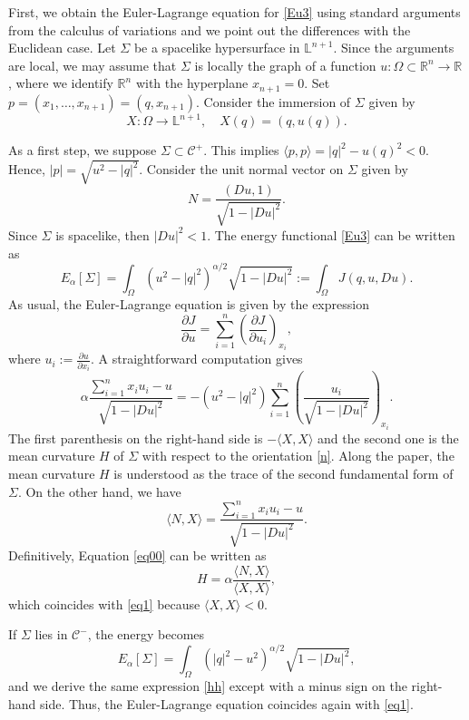 \documentclass[a4paper,12pt]{amsart}
\theoremstyle{definition}
\def\r{\mathbb R}
\def\l{\mathbb L}
\begin{document}
First, we obtain the Euler-Lagrange equation for \eqref{Eu3} using standard arguments from the calculus of variations and we point out the differences with the Euclidean case.  Let $\Sigma$ be a spacelike hypersurface in $\l^{n+1}$. Since the arguments are local, we may assume that $\Sigma$ is locally the graph of a function $u \colon \Omega \subset \mathbb{R}^n \to \mathbb{R}$, where we identify $\r^n$ with the hyperplane $x_{n+1}=0$. Set $p=(x_1,\ldots,x_{n+1})=(q,x_{n+1})$.  Consider the immersion of $\Sigma$ given by 
$$X\colon\Omega\to\l^{n+1},\quad X(q)=(q,u(q)).$$

As a first step, we suppose  $\Sigma\subset\mathcal{C}^+$. This implies $\langle p,p\rangle=|q|^2-u(q)^2<0$. Hence, $|p|=\sqrt{u^2-|q|^2}$. Consider the  unit normal vector on $\Sigma$ given by 
\begin{equation}\label{n}
N=\frac{(Du,1)}{\sqrt{1-|Du|^2}}.
\end{equation} 
Since $\Sigma$ is spacelike, then $|Du|^2<1$. The energy functional  \eqref{Eu3} can be written as
$$E_\alpha[\Sigma]=\int_\Omega (u^2-|q|^2)^{\alpha/2}\sqrt{1-|Du|^2}:=\int_\Omega J(q,u,Du).$$
 As usual, the Euler-Lagrange equation is given by the expression
$$\frac{\partial J}{\partial u}=\sum_{i=1}^n\left(\frac{\partial J}{\partial u_i}\right)_{x_i},$$
where $u_i:=\frac{\partial u}{\partial x_i}$. A straightforward computation gives
\begin{equation}\label{eq0}
\alpha \frac{\sum_{i=1}^n x_i u_i-u }{\sqrt{1-|Du|^2}}=-(u^2-|q|^2)\sum_{i=1}^n\left(\frac{u_i}{\sqrt{1-|Du|^2}}\right)_{x_i}.
\end{equation}
The first parenthesis on the right-hand side is $-\langle X,X\rangle$ and the second one is  the mean curvature $H$ of $\Sigma$ with respect to the orientation \eqref{n}.  Along the paper, the mean curvature $H$ is understood as the trace of the second fundamental form of $\Sigma$. On the other hand, we have
$$\langle N,X\rangle=\frac{\sum_{i=1}^n x_i u_i-u }{\sqrt{1-|Du|^2}}.$$
Definitively, Equation \eqref{eq00} can be written as
\begin{equation}\label{hh}
H=\alpha\frac{\langle N,X\rangle}{\langle X,X\rangle},
\end{equation}
which coincides with \eqref{eq1} because $\langle X,X\rangle<0$. 

If $\Sigma$ lies in $\mathcal{C}^-$, the   energy becomes
$$E_\alpha[\Sigma]=\int_\Omega (|q|^2-u^2)^{\alpha/2}\sqrt{1-|Du|^2},$$
and we derive the same expression \eqref{hh} except with a minus sign on the right-hand side. Thus, the Euler-Lagrange equation  coincides again with   \eqref{eq1}. 
\end{document}
